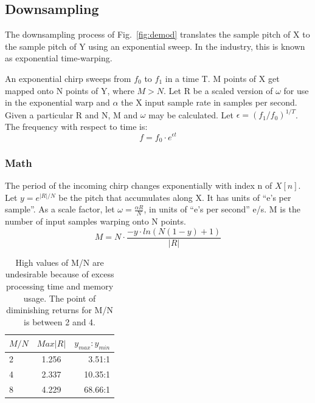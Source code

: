 \subsection{Downsampling}

The downsampling process of Fig.~\ref{fig:demod} translates the sample pitch of
X to the sample pitch of Y using an exponential sweep.
In the industry, this is known as exponential time-warping.

An exponential chirp sweeps from $f_0$ to $f_1$ in a time T.
M points of X get mapped onto N points of Y, where $M > N$.
Let R be a scaled version of $\omega$ for use in the exponential warp and
$\alpha$ the X input sample rate in samples per second.
Given a particular R and N, M and $\omega$ may be calculated.
Let $\epsilon = (f_1/f_0)^{1/T}$. The frequency with respect to time is:
\begin{equation}
f = f_0 \cdot e^{\epsilon t}
\end{equation}

\subsubsection{Math}

The period of the incoming chirp changes exponentially with index n of $X[n]$.
Let $y = e^{|R|/N}$ be the pitch that accumulates along X.
It has units of ``e's per sample''.
As a scale factor, let $\omega = \frac{\alpha R}{N}$,
in units of ``e's per second'' e/s.
M is the number of input samples warping onto N points.
\begin{equation}  \label{eq:M_N}
M = N \cdot\frac{-y \cdot ln\left( N(1-y) + 1 \right)}{|R|}
\end{equation}

\begin{table}
	\label{tab:MNR}
	\caption{High values of M/N are undesirable because of excess processing
	time and memory usage.
    The point of diminishing returns for M/N is between 2 and 4.
    }
	\centering
	\begin{tabular}{lcr}
		\hline\hline
		$M/N$ & $Max |R|$ & $y_{max}:y_{min}$ \\ [0.5ex]
		\hline
		2 & 1.256 & 3.51:1\\
		4 & 2.337 & 10.35:1\\
		8 & 4.229 & 68.66:1\\
		\hline
	\end{tabular}
\end{table}

